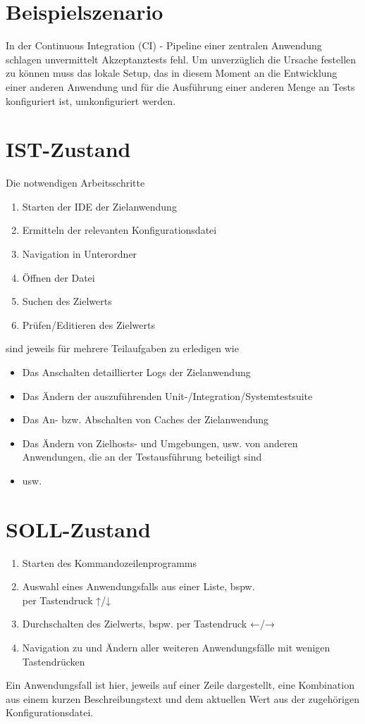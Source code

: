 \documentclass[a4paper,11pt]{article}
\begin{document}
\section{Beispielszenario}
In der Continuous Integration (CI) - Pipeline einer zentralen Anwendung schlagen
unvermittelt Akzeptanztests fehl. Um unverzüglich die Ursache festellen zu können
muss das lokale Setup, das in diesem Moment an die Entwicklung einer anderen
Anwendung und für die Ausführung einer anderen Menge an Tests konfiguriert ist,
umkonfiguriert werden.

\section{IST-Zustand}
Die notwendigen Arbeitsschritte
\begin{enumerate}
	\item Starten der IDE der Zielanwendung
	\item Ermitteln der relevanten Konfigurationsdatei
	\item Navigation in Unterordner
	\item Öffnen der Datei
	\item Suchen des Zielwerts
	\item Prüfen/Editieren des Zielwerts
\end{enumerate}
sind jeweils für mehrere Teilaufgaben zu erledigen wie
\begin{itemize}
	\item Das Anschalten detaillierter Logs der Zielanwendung
	\item Das Ändern der auszuführenden Unit-/Integration/Systemtestsuite
	\item Das An- bzw. Abschalten von Caches der Zielanwendung
	\item Das Ändern von Zielhosts- und Umgebungen, usw. von anderen
	      Anwendungen, die an der Testausführung beteiligt sind
	\item usw.
\end{itemize}

\section{SOLL-Zustand}
\begin{enumerate}
	\item Starten des Kommandozeilenprogramms
	\item Auswahl eines Anwendungsfalls aus einer Liste, bspw.\\
	      per Tastendruck ↑/↓
	\item Durchschalten des Zielwerts, bspw. per Tastendruck ←/→
	\item Navigation zu und Ändern aller weiteren Anwendungsfälle mit wenigen
	      Tastendrücken
\end{enumerate}
Ein Anwendungsfall ist hier, jeweils auf einer Zeile dargestellt, eine Kombination
aus einem kurzen Beschreibungstext und dem aktuellen Wert aus der zugehörigen
Konfigurationsdatei.
\end{document}
